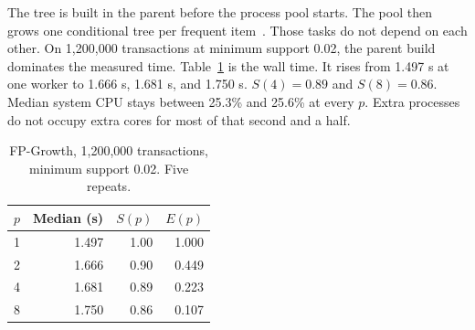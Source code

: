 The tree is built in the parent before the process pool starts. The pool then grows one conditional tree per frequent item~\cite{han2000}. Those tasks do not depend on each other. On 1{,}200{,}000 transactions at minimum support 0.02, the parent build dominates the measured time. Table~\ref{tab:t3} is the wall time. It rises from 1.497 s at one worker to 1.666 s, 1.681 s, and 1.750 s. $S(4) = 0.89$ and $S(8) = 0.86$. Median system CPU stays between 25.3\% and 25.6\% at every $p$. Extra processes do not occupy extra cores for most of that second and a half.

\begin{table}[ht]
\centering
\caption{FP-Growth, 1{,}200{,}000 transactions, minimum support 0.02. Five repeats.}
\label{tab:t3}
\begin{tabular}{rrrr}
\toprule
$p$ & Median (s) & $S(p)$ & $E(p)$ \\
\midrule
1 & 1.497 & 1.00 & 1.000 \\
2 & 1.666 & 0.90 & 0.449 \\
4 & 1.681 & 0.89 & 0.223 \\
8 & 1.750 & 0.86 & 0.107 \\
\bottomrule
\end{tabular}
\end{table}
